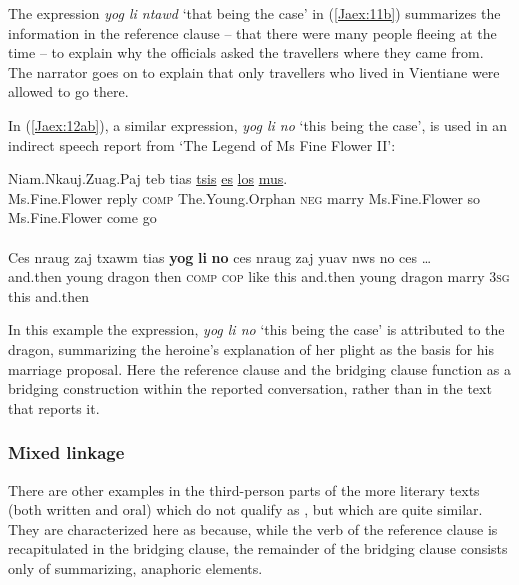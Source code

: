 \documentclass[output=paper]{LSP/langsci}
\begin{document}
\noindent
The expression \textit{yog li ntawd} `that being the case' in (\ref{Jaex:11b}) summarizes the information in the reference clause – that there were many people fleeing at the time – to explain why the officials asked the travellers where they came from. The narrator goes on to explain that only travellers who lived in Vientiane were allowed to go there.
 
In (\ref{Jaex:12ab}), a similar expression, \textit{yog li no} `this being the case', is used in an indirect speech report from `The Legend of Ms Fine Flower II':
 
\begin{exe}
\ex \label{Jaex:12ab}
\begin{xlist}
\ex \label{Jaex:12a}
\gll Niam.Nkauj.Zuag.Paj teb tias \underline{} \underline{tsis} \underline{} \underline{} \underline{es} \underline{}     \underline{los} \underline{mus}.        \\
 Ms.Fine.Flower reply \textsc{comp} The.Young.Orphan \textsc{neg} marry Ms.Fine.Flower so Ms.Fine.Flower come  go\\
\glt {}\\
\ex \label{Jaex:12b}
\gll Ces nraug  zaj txawm tias \textbf{yog} \textbf{li}  \textbf{no}  ces nraug  zaj   yuav   nws  no  ces …\\     	      
     and.then young dragon then \textsc{comp} \textsc{cop} like this and.then young dragon marry \textsc{3sg} this and.then\\
\glt {} \citep[][163]{johnson92}
\end{xlist}
\end{exe}


\noindent
In this example the expression, \textit{yog li no} `this being the case' is attributed to the dragon, summarizing the heroine’s explanation of her plight as the basis for his marriage proposal. Here the reference clause and the bridging clause function as a bridging construction within the reported conversation, rather than in the  text that reports it.

\subsubsection{Mixed linkage}
\label{JaMixed}
There are other examples in the third-person  parts of the more literary texts (both written and oral) which do not qualify as , but which are quite similar. They are characterized here as  because, while the verb of the reference clause is recapitulated in the bridging clause, the remainder of the bridging clause consists only of summarizing, anaphoric elements.
\end{document}

